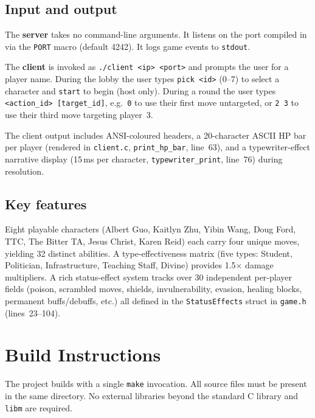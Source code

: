 \documentclass[11pt,letterpaper]{article}
\begin{document}
\subsection*{Input and output}

The \textbf{server} takes no command-line arguments. It listens on the port compiled in via the \texttt{PORT} macro (default 4242). It logs game events to \texttt{stdout}.

The \textbf{client} is invoked as \texttt{./client <ip> <port>} and prompts the user for a player name. During the lobby the user types \texttt{pick <id>} (0--7) to select a character and \texttt{start} to begin (host only). During a round the user types \texttt{<action\_id> [target\_id]}, e.g.\ \texttt{0} to use their first move untargeted, or \texttt{2 3} to use their third move targeting player~3.

The client output includes ANSI-coloured headers, a 20-character ASCII HP bar per player (rendered in \texttt{client.c}, \texttt{print\_hp\_bar}, line~63), and a typewriter-effect narrative display (15\,ms per character, \texttt{typewriter\_print}, line~76) during resolution.

\subsection*{Key features}

Eight playable characters (Albert Guo, Kaitlyn Zhu, Yibin Wang, Doug Ford, TTC, The Bitter TA, Jesus Christ, Karen Reid) each carry four unique moves, yielding 32 distinct abilities. A type-effectiveness matrix (five types: Student, Politician, Infrastructure, Teaching Staff, Divine) provides 1.5$\times$ damage multipliers. A rich status-effect system tracks over 30 independent per-player fields (poison, scrambled moves, shields, invulnerability, evasion, healing blocks, permanent buffs/debuffs, etc.) all defined in the \texttt{StatusEffects} struct in \texttt{game.h} (lines~23--104).

\section{Build Instructions}

The project builds with a single \texttt{make} invocation. All source files must be present in the same directory. No external libraries beyond the standard C library and \texttt{libm} are required.
\end{document}
